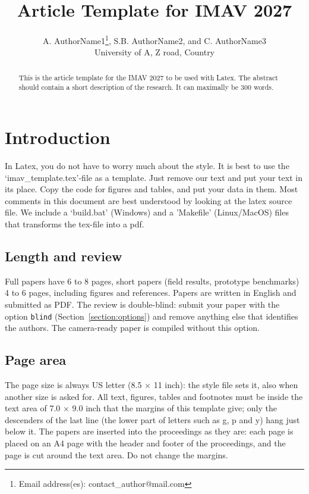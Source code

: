 \documentclass{article}
\title{Article Template for IMAV 2027}
\author{A. AuthorName1\thanks{Email address(es): contact\_author@mail.com}, S.B. AuthorName2, and C. AuthorName3 \\ University of A, Z road, Country}
\begin{document}
\maketitle
\thispagestyle{empty} %

\begin{abstract}
This is the article template for the IMAV 2027 to be used with Latex. The abstract should contain a short description of the research. It can maximally be 300 words.
\end{abstract}

\section{Introduction} \label{section:introduction}
In Latex, you do not have to worry much about the style. It is best to use the `imav\_template.tex'-file as a template. Just remove our text and put your text in its place. Copy the code for figures and tables, and put your data in them. Most comments in this document are best understood by looking at the latex source file. We include a `build.bat' (Windows) and a 'Makefile' (Linux/MacOS) files that transforms the tex-file into a pdf. 

\subsection{Length and review}
Full papers have 6 to 8 pages, short papers (field results, prototype benchmarks) 4 to 6 pages, including figures and references. Papers are written in English and submitted as PDF. The review is double-blind: submit your paper with the option \texttt{blind} (Section~\ref{section:options}) and remove anything else that identifies the authors. The camera-ready paper is compiled without this option.

\subsection{Page area}
The page size is always US letter (8.5 $\times$ 11 inch): the style file sets it, also when another size is asked for. All text, figures, tables and footnotes must be inside the text area of 7.0 $\times$ 9.0 inch that the margins of this template give; only the descenders of the last line (the lower part of letters such as g, p and y) hang just below it. The papers are inserted into the proceedings as they are: each page is placed on an A4 page with the header and footer of the proceedings, and the page is cut around the text area. Do not change the margins.
\end{document}
